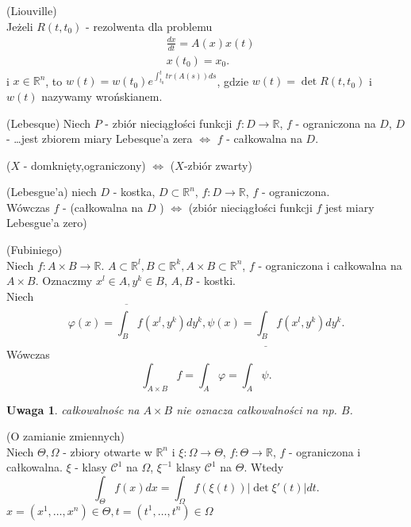\documentclass{article}
\newtheorem{uwaga}{Uwaga}
\begin{document}
\begin{tw}
(Liouville)\\
Jeżeli $R(t,t_0)$ - rezolwenta dla problemu
\begin{align*}
&\frac{dx}{dt} = A(x)x(t)\\
&x(t_0) = x_0
.\end{align*}
i $x\in \mathbb{R}^n$, to $w(t) = w(t_0)e^{\int_{t_0}^t tr(A(s))ds}$, gdzie $w(t) = \det R(t,t_0)$ i $w(t)$ nazywamy wrońskianem.\\
\end{tw}
\begin{tw}
(Lebesque) Niech $P$ - zbiór nieciągłości funkcji $f: D\to\mathbb{R}$, $f$ - ograniczona na $D$, $D$ - \ldots jest zbiorem miary Lebesque'a zera  $\iff$ $f$ - całkowalna na $D$.
\end{tw}
\begin{stw}
($X$ - domknięty,ograniczony) $\iff$ ($X$-zbiór zwarty)
\end{stw}
\begin{tw}
(Lebesgue'a) niech $D$ - kostka, $D\subset \mathbb{R}^n$, $f: D\to \mathbb{R}$, $f$ - ograniczona.\\
Wówczas $f$ - (całkowalna na $D$ ) $\iff$ (zbiór nieciągłości funkcji $f$ jest miary Lebesgue'a zero)
\end{tw}
\begin{tw}
(Fubiniego)\\
Niech $f: A\times B\to \mathbb{R}$. $A\subset\mathbb{R}^l, B\subset\mathbb{R}^k, A\times B\subset\mathbb{R}^n$, $f$ - ograniczona i całkowalna na $A\times B$. Oznaczmy $x^l\in A, y^k\in B$, $A,B$ - kostki.\\
Niech \[
\varphi(x) = \overline{\int_B}f(x^l,y^k)dy^k, \psi(x) = \underline{\int_B} f(x^l, y^k)dy^k
.\]
Wówczas \[
\int_{A\times B} f = \int_A \varphi = \int_A \psi
.\]
\begin{uwaga}
całkowalnośc na $A\times B$ nie oznacza całkowalności na np. $B$.
\end{uwaga}
\end{tw}
\begin{tw}
(O zamianie zmiennych)\\
Niech $\Theta, \Omega$ - zbiory otwarte w $\mathbb{R}^n$ i $\xi: \Omega\to \Theta$, $f: \Theta\to \mathbb{R}$, $f$ - ograniczona i całkowalna. $\xi$ - klasy $\mathcal{C}^1$ na $\Omega$, $\xi^{-1}$ klasy $\mathcal{C}^{1}$ na $\Theta$. Wtedy
\begin{equation}
\int_{\Theta} f(x) dx =  \int_{\Omega} f(\xi(t)) | \det \xi'(t) | dt.
\end{equation}
$x=(x^1,\ldots,x^n)\in \Theta, t=(t^1,\ldots,t^n)\in \Omega$
\end{tw}
\end{document}
